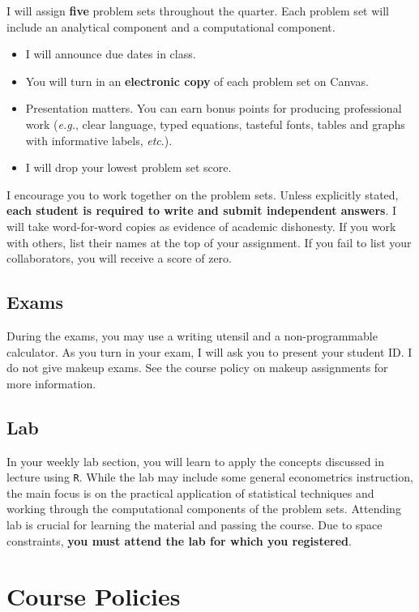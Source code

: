 \documentclass[11pt]{article}
\begin{document}
I will assign \textbf{five} problem sets throughout the quarter. Each problem set will include an analytical component and a computational component. 
\begin{itemize}
	\setlength{\itemsep}{0pt}
	\item I will announce due dates in class. 
	\item You will turn in an \textbf{electronic copy} of each problem set on Canvas.
	\item Presentation matters. You can earn bonus points for producing professional work (\textit{e.g.}, clear language, typed equations, tasteful fonts, tables and graphs with informative labels, \textit{etc}.).
	\item I will drop your lowest problem set score.
\end{itemize}
I encourage you to work together on the problem sets. Unless explicitly stated, \textbf{each student is required to write and submit independent answers}. I will take word-for-word copies as evidence of academic dishonesty. If you work with others, list their names at the top of your assignment. If you fail to list your collaborators, you will receive a score of zero.

\subsection*{Exams} 

During the exams, you may use a writing utensil and a non-programmable calculator. As you turn in your exam, I will ask you to present your student ID. I do not give makeup exams. See the course policy on makeup assignments for more information.  

\subsection*{Lab} 

In your weekly lab section, you will learn to apply the concepts discussed in lecture using \texttt{R}. While the lab may include some general econometrics instruction, the main focus is on the practical application of statistical techniques and working through the computational components of the problem sets. Attending lab is crucial for learning the material and passing the course. Due to space constraints, \textbf{you must attend the lab for which you registered}.

\section*{Course Policies}
\end{document}
